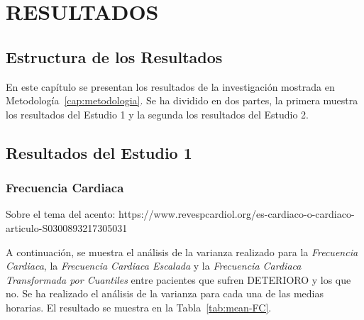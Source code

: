 \section{RESULTADOS}\label{cap:results}

\subsection{Estructura de los Resultados}\label{sec:results}

En este capítulo se presentan los resultados de la investigación mostrada en Metodología~\ref{cap:metodologia}. Se ha dividido en dos partes, la primera muestra los resultados del Estudio 1 y la segunda los resultados del Estudio 2.

\subsection{Resultados del Estudio 1}\label{sec:resultados-estudio-1}

\subsubsection{Frecuencia Cardiaca}

{\color{blue} Sobre el tema del acento: https://www.revespcardiol.org/es-cardiaco-o-cardiaco-articulo-S0300893217305031}

A continuación, se muestra el análisis de la varianza realizado para la \textit{Frecuencia Cardiaca}, la \textit{Frecuencia Cardiaca Escalada} y la \textit{Frecuencia Cardiaca Transformada por Cuantiles} entre pacientes que sufren DETERIORO y los que no. Se ha realizado el análisis de la varianza para cada una de las medias horarias. El resultado se muestra en la Tabla~\ref{tab:mean-FC}.  



